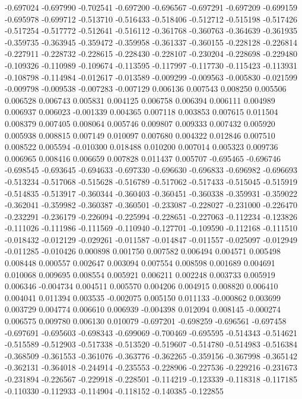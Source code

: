 -0.697024
-0.697990
-0.702541
-0.697200
-0.696567
-0.697291
-0.697209
-0.699159
-0.695978
-0.699712
-0.513710
-0.516433
-0.518406
-0.512712
-0.515198
-0.517426
-0.517254
-0.517772
-0.512641
-0.516112
-0.361768
-0.360763
-0.364639
-0.361935
-0.359735
-0.363945
-0.359472
-0.359958
-0.361337
-0.360155
-0.228128
-0.226814
-0.227911
-0.228732
-0.228615
-0.228430
-0.228107
-0.230204
-0.228698
-0.229480
-0.109326
-0.110989
-0.109674
-0.113595
-0.117997
-0.117730
-0.115423
-0.113931
-0.108798
-0.114984
-0.012617
-0.013589
-0.009299
-0.009563
-0.005830
-0.021599
-0.009798
-0.009538
-0.007283
-0.007129
0.006136
0.007543
0.008250
0.005506
0.006528
0.006743
0.005831
0.004125
0.006758
0.006394
0.006111
0.004989
0.006937
0.006023
-0.001339
0.004365
0.007118
0.003853
0.007615
0.011504
0.008379
0.007405
0.008064
0.005746
0.009807
0.009333
0.007432
0.005920
0.005938
0.008815
0.007149
0.010097
0.007680
0.004322
0.012846
0.007510
0.008522
0.005594
-0.010300
0.018488
0.010200
0.007014
0.005323
0.009736
0.006965
0.008416
0.006659
0.007828
0.011437
0.005707
-0.695465
-0.696746
-0.698545
-0.693645
-0.694633
-0.697330
-0.696630
-0.696833
-0.696982
-0.696693
-0.513234
-0.517068
-0.515628
-0.516789
-0.517062
-0.517433
-0.515045
-0.515919
-0.514835
-0.513917
-0.360344
-0.360403
-0.360451
-0.360338
-0.359931
-0.359022
-0.362041
-0.359982
-0.360387
-0.360501
-0.233087
-0.228027
-0.231000
-0.226470
-0.232291
-0.236179
-0.226094
-0.225994
-0.228651
-0.227063
-0.112234
-0.123826
-0.111026
-0.111986
-0.111569
-0.110940
-0.127701
-0.109590
-0.112168
-0.111510
-0.018432
-0.012129
-0.029261
-0.011587
-0.014847
-0.011557
-0.025097
-0.012949
-0.011285
-0.010426
0.000898
0.001750
0.007582
0.006494
0.004571
0.005498
0.008448
0.000557
0.002647
0.003094
0.007554
0.008598
0.001689
0.004691
0.010068
0.009695
0.008554
0.005921
0.006211
0.002248
0.003733
0.005919
0.006346
-0.004734
0.004511
0.005570
0.004206
0.004915
0.008820
0.006410
0.004041
0.011394
0.003535
-0.002075
0.005150
0.011133
-0.000862
0.003699
0.003729
0.004774
0.006610
0.006939
-0.004398
0.012094
0.008145
-0.000274
0.006575
0.009780
0.006130
0.010079
-0.697201
-0.698259
-0.696561
-0.697458
-0.697691
-0.695603
-0.698343
-0.699069
-0.700469
-0.695595
-0.514343
-0.514621
-0.515589
-0.512903
-0.517338
-0.513520
-0.519607
-0.514780
-0.514983
-0.516384
-0.368509
-0.361553
-0.361076
-0.363776
-0.362265
-0.359156
-0.367998
-0.365142
-0.362131
-0.364018
-0.244914
-0.235553
-0.228906
-0.227536
-0.229216
-0.231673
-0.231894
-0.226567
-0.229918
-0.228501
-0.114219
-0.123339
-0.118318
-0.117185
-0.110330
-0.112933
-0.114904
-0.118152
-0.140385
-0.122855
